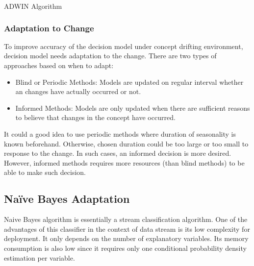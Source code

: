 \documentclass[a4paper, 11pt, oneside]{book}
\begin{document}
\begin{algorithm}[htbp]
    \DontPrintSemicolon
\label{alg:adwin}
\caption{ADWIN Algorithm}

\end{algorithm}

\subsubsection{Adaptation to Change}
To improve accuracy of the decision model under concept drifting environment, decision model needs adaptation to the change. There are two types of approaches based on when to adapt: 
\begin{itemize}    
    \item Blind or Periodic Methods: Models are updated on regular interval whether an changes have actually occurred or not. 
    \item Informed Methods: Models are only updated when there are sufficient reasons to believe that changes in the concept have occurred.
\end{itemize}
It could a good idea to use periodic methods where duration of seasonality is known beforehand. Otherwise, chosen duration could be too large or too small to response to the change. In such cases, an informed decision is more desired. However, informed methods requires more resources (than blind methods) to be able to make such decision.


\subsection{Na\"ive Bayes Adaptation}
Naive Bayes algorithm is essentially a stream classification algorithm. One of the advantages of this classifier in the context of data stream is its low complexity for deployment. It only depends on the number of explanatory variables. Its memory consumption is also low since it requires only one conditional probability density estimation per variable.
\end{document}
